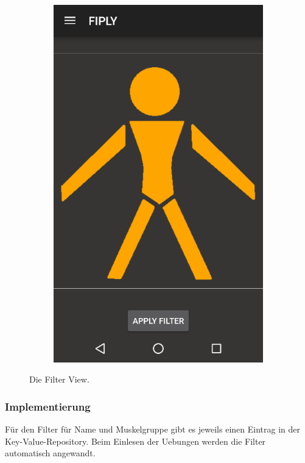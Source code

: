 \documentclass[FIPLY_base.tex]{subfiles}
\begin{document}
\begin{figure}[H]
	\begin{subfigure}[b]{0.3\textwidth}
	\includegraphics[scale=0.55]{img/Uebungskatalog_filter}
	\end{subfigure}
	\hfil
	\caption{Die Filter View.}
\end{figure}
\newpage

\subsubsection{Implementierung}
Für den Filter für Name und Muskelgruppe gibt es jeweils einen Eintrag in der Key-Value-Repository.
Beim Einlesen der Uebungen werden die Filter automatisch angewandt.
\end{document}

